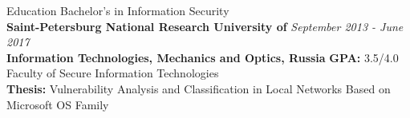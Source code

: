\documentclass[10pt]{resume} %
\begin{document}
\begin{rSection}{Education}
\vspace{-0.3cm}
Bachelor's in Information Security \\
{\bf Saint-Petersburg National Research University of} \hfill \small{\em September 2013 - June 2017}\normalsize\\ \textbf{Information Technologies, Mechanics and Optics, Russia} \hfill \small\textbf{GPA:} 3.5/4.0 \normalsize
\\ Faculty of Secure Information Technologies\\
\textbf{Thesis:} Vulnerability Analysis and Classification in Local Networks Based on Microsoft OS Family\\

\end{rSection}
\end{document}
